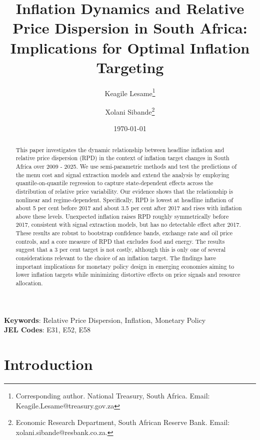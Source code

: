 \documentclass[
  letterpaper,
  DIV=11,
  numbers=noendperiod]{scrartcl}
\author{}
\date{}
\begin{document}
\title{Inflation Dynamics and Relative Price Dispersion in South Africa: Implications for Optimal Inflation Targeting}
\author {Keagile Lesame\footnote{Corresponding author. National Treasury, South Africa. Email: Keagile.Lesame@treasury.gov.za} \and
Xolani Sibande\footnote{Economic Research Department, South African Reserve Bank. Email: xolani.sibande@resbank.co.za.}}


\date{\today}
\maketitle


\begin{abstract}

This paper investigates the dynamic relationship between headline inflation and relative price dispersion (RPD) in the context of inflation target changes in South Africa over 2009 - 2025. We use semi-parametric methods and test the predictions of the menu cost and signal extraction models and extend the analysis by employing quantile-on-quantile regression to capture state-dependent effects across the distribution of relative price variability. Our evidence shows that the relationship is nonlinear and regime-dependent. Specifically, RPD is lowest at headline inflation of about 5 per cent before 2017 and about 3.5 per cent after 2017 and rises with inflation above these levels. Unexpected inflation raises RPD roughly symmetrically before 2017, consistent with signal extraction models, but has no detectable effect after 2017. These results are robust to bootstrap confidence bands, exchange rate and oil price controls, and a core measure of RPD that excludes food and energy. The results suggest that a 3 per cent target is not costly, although this is only one of several considerations relevant to the choice of an inflation target. The findings have important implications for monetary policy design in emerging economies aiming to lower inflation targets while minimizing distortive effects on price signals and resource allocation.

\end{abstract}

\noindent\textbf{Keywords}: Relative Price Dispersion, Inflation, Monetary Policy\\
\textbf{JEL Codes}: E31, E52, E58
\newpage

\section{Introduction}\label{introduction}
\end{document}

